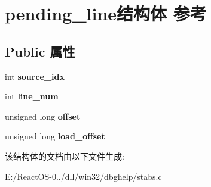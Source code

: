 \hypertarget{structpending__line}{}\section{pending\+\_\+line结构体 参考}
\label{structpending__line}
\subsection*{Public 属性}
\begin{DoxyCompactItemize}
\item 
\mbox{\label{structpending__line_aa114bb3df9e8c9e2564678ea87004581}} 
int {\bfseries source\+\_\+idx}
\item 
\mbox{\label{structpending__line_a7cfaf0b7c4fe805ff53def9732438da2}} 
int {\bfseries line\+\_\+num}
\item 
\mbox{\label{structpending__line_add0ec5764301c2e53f360c559d6f515d}} 
unsigned long {\bfseries offset}
\item 
\mbox{\label{structpending__line_a215162a3861ff421f0775728c7277757}} 
unsigned long {\bfseries load\+\_\+offset}
\end{DoxyCompactItemize}


该结构体的文档由以下文件生成\+:\begin{DoxyCompactItemize}
\item 
E\+:/\+React\+O\+S-\/0../dll/win32/dbghelp/stabs.\+c\end{DoxyCompactItemize}
